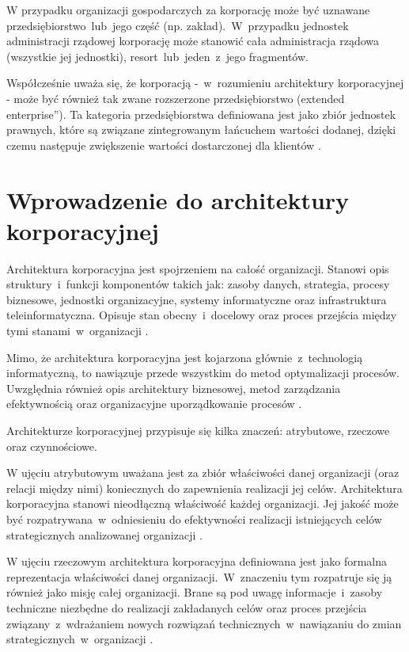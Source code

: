 W przypadku organizacji gospodarczych za korporację może być uznawane przedsiębiorstwo~lub~jego część (np. zakład).~W~przypadku jednostek administracji rządowej korporację może stanowić cała administracja rządowa (wszystkie jej jednostki), resort~lub~jeden~z~jego fragmentów.

Współcześnie uważa się, że korporacją -~w~rozumieniu architektury korporacyjnej - może być również tak zwane rozszerzone przedsiębiorstwo (\quotedblbase extended enterprise\textquotedblright). Ta kategoria przedsiębiorstwa definiowana jest jako zbiór jednostek prawnych, które są związane zintegrowanym łańcuchem wartości dodanej, dzięki czemu następuje zwiększenie wartości dostarczonej dla klientów \cite{SobArchKorpDobrPr}.

\section{Wprowadzenie do architektury korporacyjnej}
Architektura korporacyjna jest spojrzeniem na całość organizacji. Stanowi opis struktury~i~funkcji komponentów takich jak: zasoby danych, strategia, procesy biznesowe, jednostki organizacyjne, systemy informatyczne oraz infrastruktura teleinformatyczna. Opisuje stan obecny~i~docelowy oraz proces przejścia między tymi stanami~w~organizacji \cite{ArchKorpSob}.

Mimo, że architektura korporacyjna jest kojarzona głównie~z~technologią informatyczną, to nawiązuje przede wszystkim do metod optymalizacji procesów. Uwzględnia również opis architektury biznesowej, metod zarządzania efektywnością oraz organizacyjne uporządkowanie procesów \cite{ArchKorpSzymSup}.

Architekturze korporacyjnej przypisuje się kilka znaczeń: atrybutowe, rzeczowe oraz czynnościowe.

W ujęciu atrybutowym uważana jest za zbiór właściwości danej organizacji (oraz relacji między nimi) koniecznych do zapewnienia realizacji jej celów. Architektura korporacyjna stanowi nieodłączną właściwość każdej organizacji. Jej jakość może być rozpatrywana~w~odniesieniu do efektywności realizacji istniejących celów strategicznych analizowanej organizacji \cite{ArchKorpSob}.

W ujęciu rzeczowym architektura korporacyjna definiowana jest jako formalna reprezentacja właściwości danej organizacji.~W~znaczeniu tym rozpatruje się ją również jako misję całej organizacji. Brane są pod uwagę informacje~i~zasoby techniczne niezbędne do realizacji zakładanych celów oraz proces przejścia związany~z~wdrażaniem nowych rozwiązań technicznych~w~nawiązaniu do zmian strategicznych~w~organizacji \cite{ArchKorpSob}.

